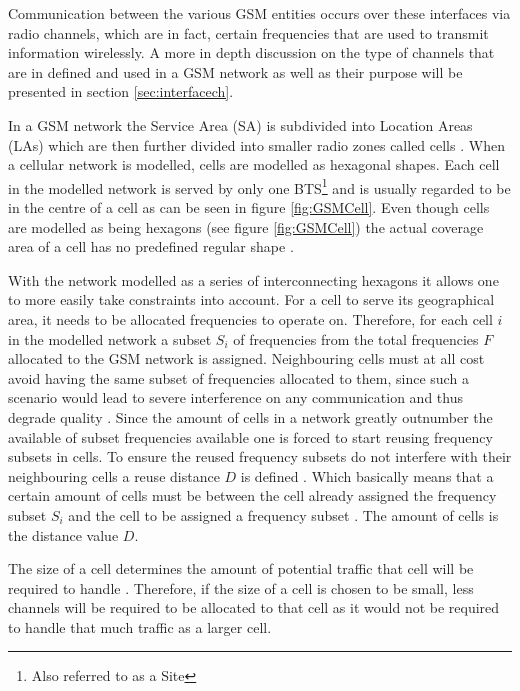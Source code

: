 Communication between the various GSM entities occurs over these interfaces via radio channels, which are in fact, certain frequencies that are used to transmit information wirelessly. A more in depth discussion on the type of channels that are in defined and used in a GSM network as well as their purpose will be presented in section \ref{sec:interfacech}.

In a GSM network the Service Area (SA) is subdivided into Location Areas (LAs) which are then further divided into smaller radio zones called cells \cite{GSMSecurInTeleNetwork}. When a cellular network is modelled, cells are modelled as hexagonal shapes. Each cell in the modelled network is served by only one BTS\footnote{Also referred to as a Site} and is usually regarded to be in the centre of a cell as can be seen in figure \ref{fig:GSMCell}\cite{GSMArchitectureProtocolsServices}. Even though cells are modelled as being hexagons (see figure \ref{fig:GSMCell}) the actual coverage area of a cell has no predefined regular shape \cite{GSMArchitectureProtocolsServices}.

With the network modelled as a series of interconnecting hexagons it allows one to more easily take constraints into account. For a cell to serve its geographical area, it needs to be allocated frequencies to operate on. Therefore, for each cell $i$ in the modelled network a subset $S_i$ of frequencies from the total frequencies $F$ allocated to the GSM network is assigned\cite{GSMArchitectureProtocolsServices}. Neighbouring cells must at all cost avoid having the same subset of frequencies allocated to them, since such a scenario would lead to severe interference on any communication and thus degrade quality \cite{GSMArchitectureProtocolsServices}.
Since the amount of cells in a network greatly outnumber the available of subset frequencies available one is forced to start reusing frequency subsets in cells. To ensure the reused frequency subsets do not interfere with their neighbouring cells a reuse distance $D$ is defined \cite{GSMArchitectureProtocolsServices}. Which basically means that a certain amount of cells must be between the cell already assigned the frequency subset $S_i$ and the cell to be assigned a frequency subset \cite{GSMArchitectureProtocolsServices}. The amount of cells is the distance value $D$.

The size of a cell determines the amount of potential traffic that cell will be required to handle \cite{GSM92,Eisenblatter,GSMArchitectureProtocolsServices}. Therefore, if the size of a cell is chosen to be small, less channels will be required to be allocated to that cell as it would not be required to handle that much traffic as a larger cell. 

